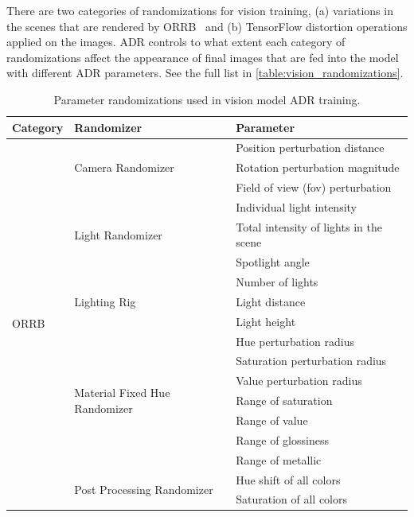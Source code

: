 There are two categories of randomizations for vision training, (a) variations in the scenes that are rendered by ORRB~\citep{chociej2019orrb} and (b) TensorFlow distortion operations applied on the images. ADR controls to what extent each category of randomizations affect the appearance of final images that are fed into the model with different ADR parameters. See the full list in \autoref{table:vision_randomizations}.


\begin{table}[h]
    \caption{Parameter randomizations used in vision model ADR training.}
    \centering
    \renewcommand{\arraystretch}{1.3}
    \begin{tabular}{@{}l|l|l@{}}
        \toprule
        \textbf{Category} & \textbf{Randomizer} & \textbf{Parameter} \\
        \midrule
        \multirow{26}{*}{ORRB~\cite{chociej2019orrb}}
        & \multirow{3}{*}{Camera Randomizer} & Position perturbation distance \\
        & & Rotation perturbation magnitude \\
        & & Field of view (fov) perturbation \\
        \cmidrule{2-3}
        & \multirow{3}{*}{Light Randomizer} & Individual light intensity \\
        & & Total intensity of lights in the scene \\
        & & Spotlight angle \\
        \cmidrule{2-3}
        & \multirow{3}{*}{Lighting Rig} & Number of lights \\
        & & Light distance \\
        & & Light height \\
        \cmidrule{2-3}
        & \multirow{7}{*}{Material Fixed Hue Randomizer} & Hue perturbation radius \\
        & & Saturation perturbation radius \\
        & & Value perturbation radius \\
        & & Range of saturation \\
        & & Range of value \\
        & & Range of glossiness \\
        & & Range of metallic \\
        \cmidrule{2-3}
        & \multirow{11}{*}{Post Processing Randomizer} & Hue shift of all colors \\
        & & Saturation of all colors \\

\end{tabular}
\end{table}
